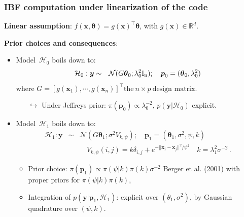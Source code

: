 \documentclass[nopagenumber,9pt]{beamer}
\newcommand{\bs}{\boldsymbol}
\begin{document}
\begin{frame}
 
\frametitle{IBF computation under linearization of the code}
{\bf{ Linear assumption}}: 
$f(\bs x,\bs \theta)=g(\bs x)^\top\bs\theta$,
with $g(\bs x)\in\mathbb R^d$.
  
\smallskip
{\bf{ Prior choices and consequences}}: 
\begin{itemize}
	\item Model~$\mathcal{H}_0$ boils down to:
	\begin{eqnarray*}
	\mathcal H_0: \bs y &\sim& 
	\mathcal N({ G}\bs\theta_0; \lambda_0^2\rm I_n);\quad \bs p_0 = (\bs\theta_0, \lambda_0^2)
	\end{eqnarray*}
	where ${ G}=[g(\bs x_1),\cdots,g(\bs x_n)]^\top \text{the}\ n\times p\ \text{design matrix.}$
	\begin{itemize}
		\item[$\hookrightarrow$] Under Jeffreys prior: $\pi(\bs p_0)\propto\lambda_0^{-2}$, $p(\bs y|\mathcal H_0)$  explicit.
	\end{itemize}
	\item Model~$\mathcal H_1$ boils down to:
	\begin{eqnarray*}
	\mathcal H_1: \bs y &\sim& 
	\mathcal N( G\bs\theta_1; \sigma^2 V_{k,\psi});\quad
	\bs p_1 = (\bs\theta_1, \sigma^2,\psi,k) 
	\\&&\quad V_{k,\psi}(i,j) =k\delta_{i,j}+e^{-||\bs x_i - \bs x_j||^2/\psi^2}
	\quad k=\lambda_1^2\sigma^{-2}\,.
	\end{eqnarray*}

	\begin{itemize}
		\item Prior choice: $\pi(\bs p_1)\propto \pi(\psi|k)\pi(k)\sigma^{-2}$ {\color{blue} Berger et al. (2001)} with proper priors for $\pi(\psi|k)\pi(k)$,
		\item Integration of $p(\bs y|\bs p_1,\mathcal H_1)$: {{ explicit}} over $(\theta_1, \sigma^2)$, by {{ Gaussian quadrature}} over $(\psi,k)$.
	\end{itemize}
\end{itemize}

 
\end{frame}
\end{document}
